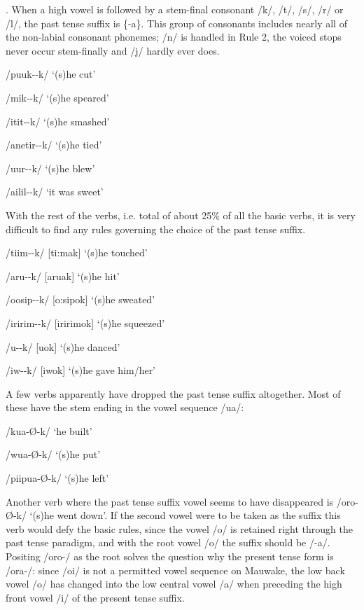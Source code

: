 . When a high vowel is followed by a stem-final consonant /k/, /t/, /s/, /r/ or /l/, the past tense suffix is \{-a\}.  This group of consonants includes nearly all of the non-labial consonant phonemes; /n/ is handled in Rule 2, the voiced stops never occur stem-finally and /j/ hardly ever does.  

/puuk--k/  `(s)he cut'

/mik--k/  `(s)he speared'

/itit--k/  `(s)he smashed'

/anetir--k/  `(s)he tied'

/{\textphi}uur--k/  `(s)he blew'

/a{\textphi}ilil--k/  `it was sweet'

With the rest of the verbs, i.e. total of about 25\% of all the basic verbs, it is very difficult to find any rules governing the choice of the past tense suffix.

/tiim--k/  [{{\textprimstress}ti:mak}]  `(s)he touched'

/aru{\textphi}--k/  [a{{\textprimstress}ru}{\textphi}ak]  `(s)he hit'

/oosip--k/  [{{\textprimstress}o:sipok}]  `(s)he sweated'

/{\textphi}iririm--k/  [{\textphi}i{{\textprimstress}ririmok}]  `(s)he squeezed'

/u{\textphi}--k/  [u{\textphi}{{\textprimstress}ok}]  `(s)he danced'

/iw--k/  [iw{{\textprimstress}ok}]   `(s)he gave him/her'

A few verbs apparently have dropped the past tense suffix altogether.  Most of these have the stem ending in the vowel sequence /ua/:

/kua-{\O-k}/  `he built'

/wua-{\O-k}/  `(s)he put'

/piipua-{\O-k}/  `(s)he left'

Another verb where the past tense suffix vowel seems to have disappeared is /oro-{\O}-k/ `(s)he went down'.  If the second vowel were to be taken as the suffix this verb would defy the basic rules, since the vowel /o/ is retained right through the past tense paradigm, and with the root vowel /o/ the suffix should be /-a/.  Positing /oro-/ as the root solves the question why the present tense form is /ora-/: since /oi/ is not a permitted vowel sequence on Mauwake, the low back vowel /o/ has changed into the low central vowel /a/ when preceding the high front vowel /i/ of the present tense suffix.

